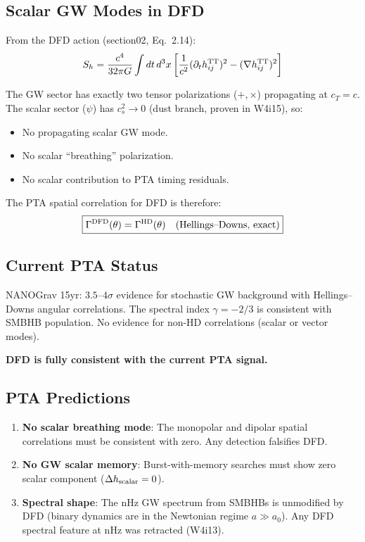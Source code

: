 \documentclass[11pt,a4paper]{article}
\newcounter{findingctr}
\newenvironment{finding}[1][]{%
  \refstepcounter{findingctr}%
  \begin{tcolorbox}[colback=blue!3!white, colframe=blue!50!black,
    title=\textbf{Finding \thefindingctr: #1}]
}{%
  \end{tcolorbox}%
}
\begin{document}
\begin{finding}[\textbf{PTA}: Standard Hellings--Downs, Zero Scalar Mode]

\subsection*{Scalar GW Modes in DFD}

From the DFD action (section02, Eq.~2.14):
\begin{equation}
S_h = \frac{c^4}{32\pi G}\int dt\,d^3x\left[
\frac{1}{c^2}(\partial_t h_{ij}^{\rm TT})^2
- (\nabla h_{ij}^{\rm TT})^2\right]
\end{equation}

The GW sector has exactly two tensor polarizations ($+, \times$)
propagating at $c_T = c$.  The scalar sector ($\psi$) has
$c_s^2 \to 0$ (dust branch, proven in W4i15), so:
\begin{itemize}[nosep]
\item No propagating scalar GW mode.
\item No scalar ``breathing'' polarization.
\item No scalar contribution to PTA timing residuals.
\end{itemize}

The PTA spatial correlation for DFD is therefore:
\begin{equation}
\boxed{\Gamma^{\rm DFD}(\theta) = \Gamma^{\rm HD}(\theta)
\quad\text{(Hellings--Downs, exact)}}
\end{equation}

\subsection*{Current PTA Status}

NANOGrav 15yr: $3.5$--$4\sigma$ evidence for stochastic GW
background with Hellings--Downs angular correlations.  The
spectral index $\gamma = -2/3$ is consistent with SMBHB population.
No evidence for non-HD correlations (scalar or vector modes).

\textbf{DFD is fully consistent with the current PTA signal.}

\subsection*{PTA Predictions}

\begin{enumerate}[nosep]
\item \textbf{No scalar breathing mode}: The monopolar and dipolar
  spatial correlations must be consistent with zero.
  Any detection falsifies DFD.
\item \textbf{No GW scalar memory}: Burst-with-memory searches
  must show zero scalar component ($\Delta h_{\rm scalar} = 0$).
\item \textbf{Spectral shape}: The nHz GW spectrum from SMBHBs is
  unmodified by DFD (binary dynamics are in the Newtonian regime
  $a \gg a_0$).  Any DFD spectral feature at nHz was retracted
  (W4i13).
\end{enumerate}


\end{finding}
\end{document}
